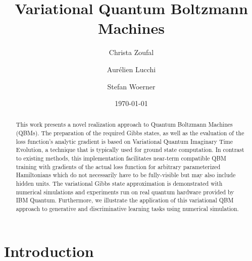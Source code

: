 \documentclass[twocolumn, aps, pra, superscriptaddress, floatfix]{revtex4}
\begin{document}
\title{Variational Quantum Boltzmann Machines}%

\author{Christa Zoufal}%

\author{Aur\'{e}lien Lucchi}

\author{Stefan Woerner}
		
\date{\today}

\begin{abstract}
This work presents a novel realization approach to Quantum Boltzmann Machines (QBMs). 
The preparation of the required Gibbs states, as well as the evaluation of the loss function's analytic gradient is based on Variational Quantum Imaginary Time Evolution, a technique that is typically used for ground state computation. 
In contrast to existing methods, this implementation facilitates near-term compatible QBM training with gradients of the actual loss function for arbitrary parameterized Hamiltonians which do not necessarily have to be fully-visible but may also include hidden units.
The variational Gibbs state approximation is demonstrated with numerical simulations and experiments run on real quantum hardware provided by IBM Quantum.
Furthermore, we illustrate the application of this variational QBM approach to generative and discriminative learning tasks using numerical simulation.
\end{abstract}

\maketitle

\section{Introduction}
\end{document}
